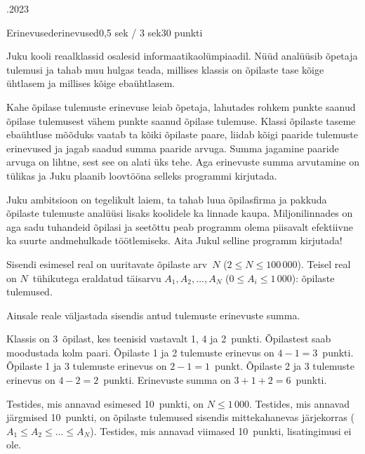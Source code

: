 \documentclass[a4paper,11pt]{article}
\begin{document}
\begin{ol}{\eio}{.2023}{\yle}{}
\begin{yl}{3}{Erinevused}{erinevused}{0,5 sek / 3 sek}{30 punkti}

Juku kooli reaalklassid osalesid informaatikaolümpiaadil. Nüüd analüüsib õpetaja tulemusi ja tahab muu hulgas teada, millises klassis on õpilaste tase kõige ühtlasem ja millises kõige eba\-ühtlasem.

Kahe õpilase tulemuste erinevuse leiab õpetaja, lahutades rohkem punkte saanud õpilase tulemusest vähem punkte saanud õpilase tulemuse. Klassi õpilaste taseme ebaühtluse mõõduks vaatab ta kõiki õpilaste paare, liidab kõigi paaride tulemuste erinevused ja jagab saadud summa paaride arvuga. Summa jagamine paaride arvuga on lihtne, sest see on alati üks tehe. Aga erinevuste summa arvutamine on tülikas ja Juku plaanib loovtööna selleks programmi kirjutada.

Juku ambitsioon on tegelikult laiem, ta tahab luua õpilasfirma ja pakkuda õpilaste tulemuste analüüsi lisaks koolidele ka linnade kaupa. Miljonilinnades on aga sadu tuhandeid õpilasi ja seetõttu peab programm olema piisavalt efektiivne ka suurte andmehulkade töötlemiseks. Aita Jukul selline programm kirjutada!

\sis Sisendi esimesel real on uuritavate õpilaste arv~$N$ ($2 \le N \le 100\,000$). Teisel real on $N$~tühikutega eraldatud täisarvu $A_1, A_2, \ldots, A_N$ ($0 \le A_i \le 1\,000$): õpilaste tulemused.

\val Ainsale reale väljastada sisendis antud tulemuste erinevuste summa.

\nde[0]{3cm}{3cm}

Klassis on 3~õpilast, kes teenisid vastavalt 1, 4 ja 2~punkti. Õpilastest saab moodustada kolm paari. Õpilaste 1 ja 2 tulemuste erinevus on $4-1=3$~punkti. Õpilaste 1 ja 3 tulemuste erinevus on $2-1=1$~punkt. Õpilaste 2 ja 3 tulemuste erinevus on $4-2=2$~punkti. Erinevuste summa on $3+1+2=6$~punkti.

\hnd Testides, mis annavad esimesed 10~punkti, on $N \le 1\,000$. Testides, mis annavad järgmised 10~punkti, on õpilaste tulemused sisendis mittekahanevas järjekorras ($A_1 \le A_2 \le \ldots \le A_N$). Testides, mis annavad viimased 10~punkti, lisatingimusi ei ole.

\end{yl}
\end{ol}
\end{document}
